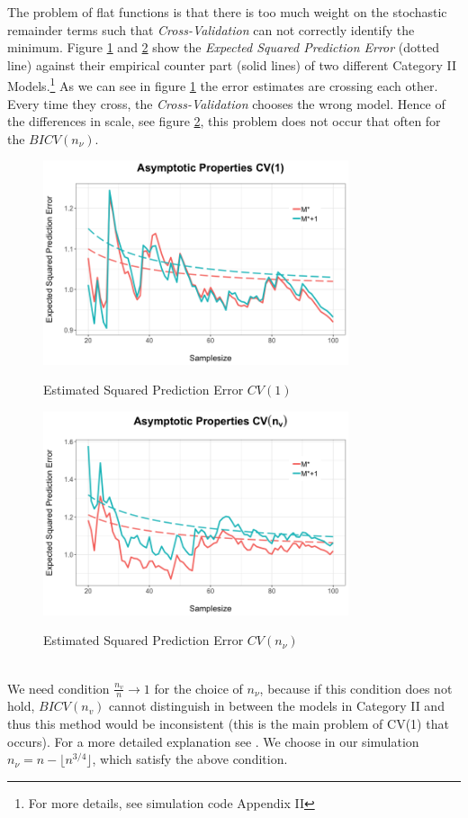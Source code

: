 \documentclass[Research_Module_ES.tex]{subfiles}
\begin{document}
The problem of flat functions is that  there is too much weight on the stochastic remainder terms such that \textit{Cross-Validation} can not correctly identify the minimum. Figure \ref{ProofSketchCV1} and \ref{ProofSektchCVn_v} show the \textit{Expected Squared Prediction Error} (dotted line) against their empirical counter part (solid lines) of two different Category II Models.\footnote{For more details, see simulation code Appendix II} As we can see in figure \ref{ProofSketchCV1} the error estimates are crossing each other. Every time they cross, the \textit{Cross-Validation} chooses the wrong model. Hence of the differences in scale, see figure \ref{ProofSektchCVn_v}, this problem does not occur that often for the $BICV(n_\nu)$.\\
\begin{figure}[!h]
	\label{ProofSketchCV1}
	\centering
	\includegraphics[width=0.8\textwidth]{ProofSketchN1.png}\\
	\caption{Estimated Squared Prediction Error $CV(1)$}
\end{figure}
\begin{figure}[!h]
	\label{ProofSektchCVn_v}
	\centering
	\includegraphics[width=0.8\textwidth]{ProofSketchNV.png}\\
	\caption{Estimated Squared Prediction Error $CV(n_\nu)$}
\end{figure}
\\
We need condition $\frac{n_v}{n}\to 1$ for the choice of $n_\nu$, because if this condition does not hold, $BICV(n_v)$ cannot distinguish in between the models in Category II and thus this method would be inconsistent (this is the main problem of CV(1) that occurs). For a more detailed explanation see \cite{shao}. We choose in our simulation $n_\nu=n-\lfloor n^{3/4}\rfloor$, which satisfy the above condition.\\
\end{document}
